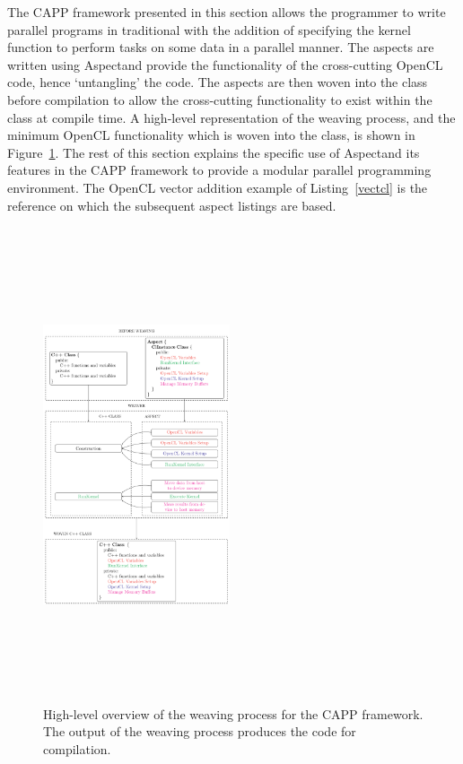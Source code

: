 \documentclass{sig-alternate-05-2015}
\begin{document}
The  CAPP framework presented in this section allows the programmer to
write parallel programs in traditional \CPP with the addition of specifying the kernel
function to perform tasks on some data in a parallel manner. The aspects
are written using Aspect\CPP and provide the functionality of the
cross-cutting OpenCL code, hence `untangling' the \CPP code. The aspects
are then woven into the \CPP class before compilation to allow the cross-cutting
functionality to exist within the \CPP class at compile time. A high-level
representation of the weaving process, and the minimum OpenCL functionality which is
woven into the \CPP class, is shown in Figure~\ref{fig:weaving}. 
The rest of this section explains the specific use of Aspect\CPP and its
features in the  CAPP framework to provide a modular parallel programming
environment. The OpenCL vector addition example of Listing~\ref{vectcl} is the
reference on which the subsequent aspect listings are based.
\begin{figure}[!t]
	\centering
	\includegraphics[height=14cm,width=0.49\textwidth]{weaving}
	\caption{High-level overview of the weaving process for the CAPP
		framework. The output of the weaving process produces the code for
	compilation.}
	\label{fig:weaving}
\end{figure}
\end{document}
